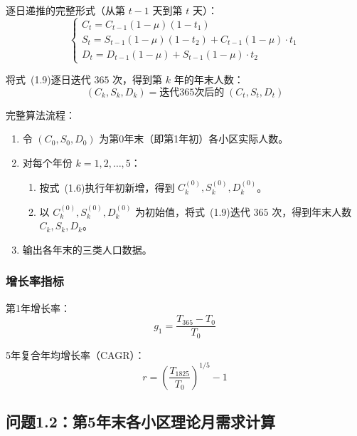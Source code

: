\documentclass[12pt,a4paper]{article}
\begin{document}
逐日递推的完整形式（从第 $t-1$ 天到第 $t$ 天）：
\begin{equation}
\boxed{
\begin{cases}
C_t = C_{t-1} (1 - \mu) (1 - t_1) \\
S_t = S_{t-1} (1 - \mu) (1 - t_2) + C_{t-1} (1 - \mu) \cdot t_1 \\
D_t = D_{t-1} (1 - \mu) + S_{t-1} (1 - \mu) \cdot t_2
\end{cases}
}
\tag{1.9}
\end{equation}

将式~(1.9)逐日迭代 $365$ 次，得到第 $k$ 年的年末人数：
\begin{equation}
(C_k, S_k, D_k) = \text{迭代365次后的} \; (C_t, S_t, D_t)
\tag{1.10}
\end{equation}

完整算法流程：
\begin{enumerate}
    \item 令 $(C_0, S_0, D_0)$ 为第0年末（即第1年初）各小区实际人数。
    \item 对每个年份 $k = 1, 2, \dots, 5$：
    \begin{enumerate}
        \item 按式~(1.6)执行年初新增，得到 $C_k^{(0)}, S_k^{(0)}, D_k^{(0)}$。
        \item 以 $C_k^{(0)}, S_k^{(0)}, D_k^{(0)}$ 为初始值，将式~(1.9)迭代 $365$ 次，得到年末人数 $C_k, S_k, D_k$。
    \end{enumerate}
    \item 输出各年末的三类人口数据。
\end{enumerate}

\subsubsection{增长率指标}
第1年增长率：
\begin{equation}
g_1 = \frac{T_{365} - T_0}{T_0}
\tag{1.11}
\end{equation}

5年复合年均增长率（CAGR）：
\begin{equation}
r = \left(\frac{T_{1825}}{T_0}\right)^{1/5} - 1
\tag{1.12}
\end{equation}

\subsection{问题1.2：第5年末各小区理论月需求计算}
\end{document}

